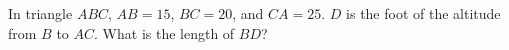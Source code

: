 In triangle $ABC$, $AB=15$, $BC=20$, and $CA=25$. $D$ is the foot of the altitude from $B$ to $AC$. What is the length of $BD$?

